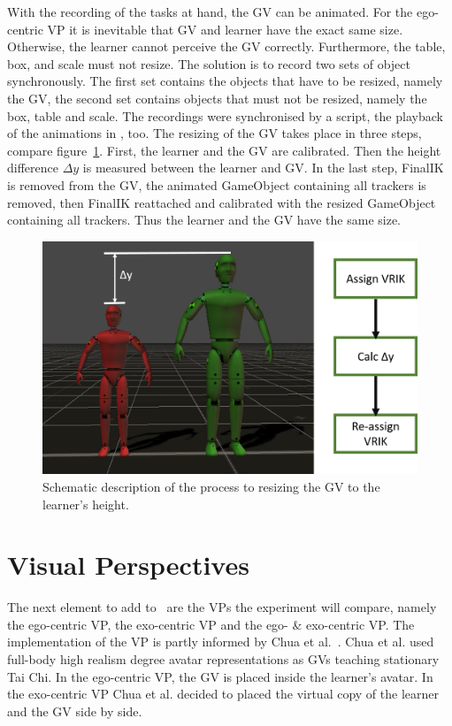 With the recording of the tasks at hand, the GV can be animated. For the ego-centric VP it is inevitable that GV and learner have the exact same size. Otherwise, the learner cannot perceive the GV correctly. Furthermore, the table, box, and scale must not resize. The solution is to record two sets of object synchronously. The first set contains the objects that have to be resized, namely the GV, the second set contains objects that must not be resized, namely the box, table and scale. The recordings were synchronised by a script, the playback of the animations in \exgo, too. The resizing of the GV takes place in three steps, compare figure~\ref{fig:resize}. First, the learner and the GV are calibrated. Then the height difference $\Delta y$ is measured between the learner and GV. In the last step, FinalIK is removed from the GV, the animated GameObject containing all trackers is removed, then FinalIK reattached and calibrated with the resized GameObject containing all trackers. Thus the learner and the GV have the same size.
\begin{figure}[htb]
	\centering
	\includegraphics[width=\textwidth]{figures/resize.png}
	\caption[Resizing the GV to the learner's height.]{Schematic description of the process to resizing the GV to the learner's height.}
	\label{fig:resize}
\end{figure}

\section{Visual Perspectives}
\label{sec:perspectives}
The next element to add to \exgo\ are the VPs the experiment will compare, namely the ego-centric VP, the exo-centric VP and the ego- \& exo-centric VP. The implementation of the VP is partly informed by Chua et al.~\cite{thaichichua}. Chua et al. used full-body high realism degree avatar representations as GVs teaching stationary Tai Chi. In the ego-centric VP, the GV is placed inside the learner's avatar. In the exo-centric VP Chua et al. decided to placed the virtual copy of the learner and the GV side by side.\\

